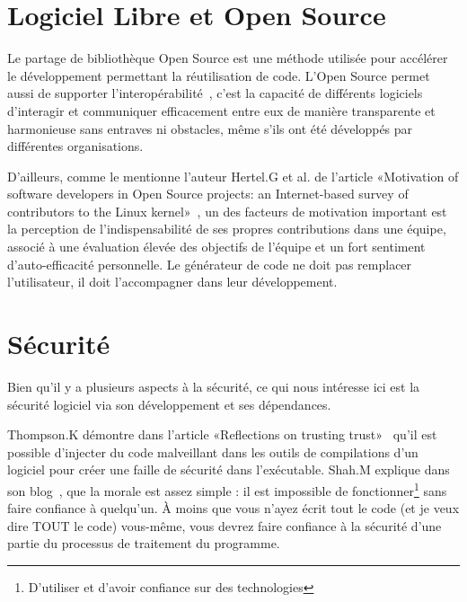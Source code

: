 \section{Logiciel Libre et Open Source}

Le partage de bibliothèque Open Source est une méthode utilisée pour accélérer le développement permettant la réutilisation de code. L’Open Source permet aussi de supporter l'interopérabilité~\cite{open_interop_2011}, c’est la capacité de différents logiciels d'interagir et communiquer efficacement entre eux de manière transparente et harmonieuse sans entraves ni obstacles, même s’ils ont été développés par différentes organisations.

D'ailleurs, comme le mentionne l'auteur Hertel.G et al. de l'article «Motivation of software developers in Open Source projects: an Internet-based survey of contributors to the Linux kernel»~\cite{HERTEL20031159}, un des facteurs de motivation important est la perception de l'indispensabilité de ses propres contributions dans une équipe, associé à une évaluation élevée des objectifs de l'équipe et un fort sentiment d'auto-efficacité personnelle. Le générateur de code ne doit pas remplacer l'utilisateur, il doit l'accompagner dans leur développement.



\section{Sécurité}

Bien qu'il y a plusieurs aspects à la sécurité, ce qui nous intéresse ici est la sécurité logiciel via son développement et ses dépendances.

Thompson.K démontre dans l'article «Reflections on trusting trust»~\cite{thompson_trusting_1984} qu'il est possible d'injecter du code malveillant dans les outils de compilations d'un logiciel pour créer une faille de sécurité dans l'exécutable. Shah.M explique dans son blog~\cite{discussion_reflection_trusting_2020}, que la morale est assez simple : il est impossible de fonctionner\footnote{D'utiliser et d'avoir confiance sur des technologies} sans faire confiance à quelqu'un. À moins que vous n'ayez écrit tout le code (et je veux dire TOUT le code) vous-même, vous devrez faire confiance à la sécurité d'une partie du processus de traitement du programme.

